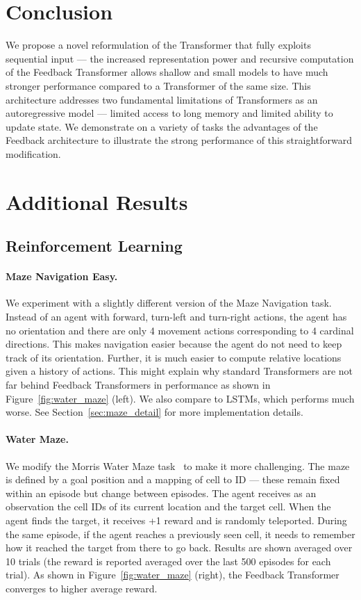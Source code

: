 \documentclass{article} \usepackage{iclr2021_conference}
\begin{document}
 
\section{Conclusion}
We propose a novel reformulation of the Transformer that fully exploits sequential input --- the increased representation power and recursive computation of the Feedback Transformer allows shallow and small models to have much stronger performance compared to a Transformer of the same size. This architecture addresses two fundamental limitations of Transformers as an autoregressive model --- limited access to long memory and limited ability to update state. We demonstrate on a variety of tasks the advantages of the Feedback architecture to illustrate the strong performance of this straightforward modification.





\clearpage 
\section{Additional Results}

\subsection{Reinforcement Learning}
\paragraph{Maze Navigation Easy.}
We experiment with a slightly different version of the Maze Navigation task. Instead of an agent with forward, turn-left and turn-right actions, the agent has no orientation and there are only 4 movement actions corresponding to 4 cardinal directions. 
This makes navigation easier because the agent do not need to keep track of its orientation.
Further, it is much easier to compute relative locations given a history of actions.
This might explain why standard Transformers are not far behind Feedback Transformers in performance as shown in Figure~\ref{fig:water_maze} (left). We also compare to LSTMs, which performs much worse. See Section~\ref{sec:maze_detail} for more implementation details.

\paragraph{Water Maze.}
We modify the Morris Water Maze task~\citep{morris1981spatial} to make it more challenging. The maze is defined by a goal position and a mapping of cell to ID --- these remain fixed within an episode but change between episodes. The agent receives as an observation the cell IDs of its current location and the target cell.  When the agent finds the target, it receives +1 reward and is randomly teleported. During the same episode, if the agent reaches a previously seen cell, it needs to remember how it reached the target from there to go back. 
Results are shown averaged over 10 trials (the reward is reported averaged over the last 500 episodes for each trial).  As shown in Figure~\ref{fig:water_maze} (right), the Feedback Transformer converges to higher average reward. 
\end{document}

